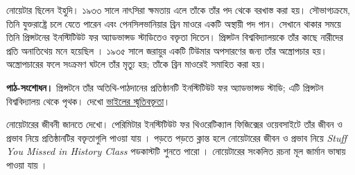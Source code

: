 \documentclass[../../../include/open-logic-section]{subfiles}
\begin{document}
নোয়েটার ছিলেন ইহুদি। ১৯৩৩ সালে নাৎসিরা
ক্ষমতায় এলে তাঁকে তাঁর পদ থেকে বরখাস্ত করা
হয়। সৌভাগ্যক্রমে, তিনি যুক্তরাষ্ট্রে চলে যেতে
পারেন এবং পেনসিলভানিয়ার ব্রিন মাওরে একটি
অস্থায়ী পদ পান। সেখানে থাকার সময়ে তিনি
প্রিন্সটনের ইনস্টিটিউট ফর অ্যাডভান্সড স্টাডিতেও
বক্তৃতা দিতেন। প্রিন্সটন বিশ্ববিদ্যালয়কে
তাঁর কাছে নারীদের প্রতি অনাতিথেয় মনে হয়েছিল
\citep[81]{Dick1981}। ১৯৩৫ সালে জরায়ুর
একটি টিউমার অপসারণের জন্য তাঁর অস্ত্রোপচার
হয়। অস্ত্রোপচারের ফলে সংক্রমণ ঘটলে তাঁর মৃত্যু
হয়; তাঁকে ব্রিন মাওরেই সমাহিত করা হয়।
\par\noindent\textbf{পাঠ-সংশোধন।} প্রিন্সটনে তাঁর অতিথি-পাঠদানের প্রতিষ্ঠানটি
ইনস্টিটিউট ফর অ্যাডভান্সড স্টাডি; এটি প্রিন্সটন
বিশ্ববিদ্যালয় থেকে পৃথক। দেখো
\href{https://celebratio.org/Noether_E/article/111/}{ভাইলের স্মৃতিবক্তৃতা}।

\begin{reading}
নোয়েটারের জীবনী জানতে \citet{Dick1981}
দেখো। পেরিমিটার ইনস্টিটিউট ফর থিওরেটিক্যাল
ফিজিক্সের ওয়েবসাইটে তাঁর জীবন ও প্রভাব নিয়ে
প্রতিষ্ঠানটির বক্তৃতাগুলি পাওয়া যায়
\citep{Perimeter2015}। পড়তে পড়তে ক্লান্ত
হলে নোয়েটারের জীবন ও প্রভাব নিয়ে
\emph{Stuff You Missed in History Class}
পডকাস্টটি শুনতে পারো \citep{Frey2015}।
নোয়েটারের সংকলিত রচনা মূল জার্মান ভাষায়
পাওয়া যায় \citep{Noether1983}।
\end{reading}
\end{document}
